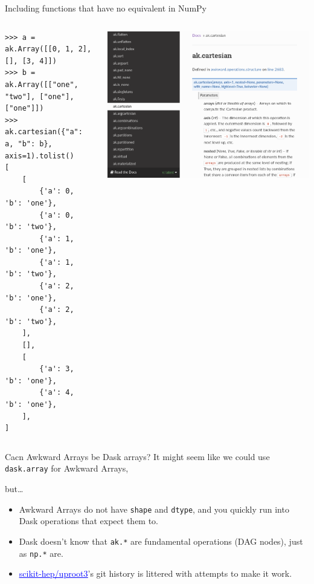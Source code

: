 \documentclass[aspectratio=169]{beamer}
\begin{document}
\begin{frame}[fragile]{Including functions that have no equivalent in NumPy}
\small
\vspace{-0.2 cm}
\begin{columns}
\begin{verbatim}
>>> a = ak.Array([[0, 1, 2], [], [3, 4]])
>>> b = ak.Array([["one", "two"], ["one"], ["one"]])
>>> ak.cartesian({"a": a, "b": b}, axis=1).tolist()
[
    [
        {'a': 0, 'b': 'one'},
        {'a': 0, 'b': 'two'},
        {'a': 1, 'b': 'one'},
        {'a': 1, 'b': 'two'},
        {'a': 2, 'b': 'one'},
        {'a': 2, 'b': 'two'},
    ],
    [],
    [
        {'a': 3, 'b': 'one'},
        {'a': 4, 'b': 'one'},
    ],
]
\end{verbatim}

\vspace{-6 cm}
\hfill\includegraphics[height=5.5 cm]{docs-cartesian.png}
\end{columns}
\end{frame}

\begin{frame}{Cacn Awkward Arrays be Dask arrays?}
\Large
It might seem like we could use \texttt{dask.array} for Awkward Arrays,

but\ldots

\large
\vspace{0.5 cm}
\begin{itemize}\setlength{\itemsep}{0.5 cm}
\item<2-> Awkward Arrays do not have \texttt{shape} and \texttt{dtype}, and you quickly run into Dask operations that expect them to.
\item<3-> Dask doesn't know that \texttt{ak.*} are fundamental operations (DAG nodes), just as \texttt{np.*} are.
\item<4-> \href{https://github.com/scikit-hep/uproot3}{\textcolor{blue}{\underline{scikit-hep/uproot3}}}'s git history is littered with attempts to make it work.
\end{itemize}
\end{frame}
\end{document}
